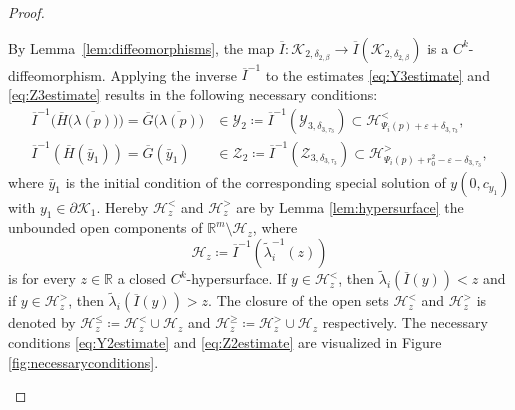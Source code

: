 \documentclass[10pt]{article}
\numberwithin{equation}{section}
\newcommand{\eps}{\varepsilon}
\begin{document}
\begin{proof}
\begin{enumerate}
			By Lemma~\ref{lem:diffeomorphisms}, the map $\overline{I}: \mathcal{K}_{2,\delta_{2,\beta}} \rightarrow \overline{I}(\mathcal{K}_{2,\delta_{2,\beta}})$ is a $C^k$-diffeomorphism. Applying the inverse $\overline{I}^{-1}$ to the estimates \eqref{eq:Y3estimate} and \eqref{eq:Z3estimate} results in the following necessary conditions:
			\begin{align}
				\overline{I}^{-1}\big(\overline{H}\big(\overline{\lambda(p)}\big)\big) = \overline{G}\big(\overline{\lambda(p)}\big)&\in \mathcal{Y}_2 \coloneqq \overline{I}^{-1}( \mathcal{Y}_{3,\delta_{3,\tau_3}}) \subset\mathcal{H}_{\Psi_i(p)+\eps+\delta_{3,\tau_3}}^{<}, \label{eq:Y2estimate}\\
				\overline{I}^{-1}(\overline{H}(\bar{y}_1)) = \overline{G}(\bar{y}_1) &\in \mathcal{Z}_2 \coloneqq \overline{I}^{-1}( \mathcal{Z}_{3,\delta_{3,\tau_3}}) \subset\mathcal{H}_{\Psi_i(p)+r_0^2-\eps-\delta_{3,\tau_3}}^{>},\label{eq:Z2estimate}
			\end{align}
			where $\bar{y}_1$ is the initial condition of the corresponding special solution of $y(0,c_{y_1})$ with $y_1\in\partial\mathcal{K}_1$. Hereby $\mathcal{H}_z^{<}$ and $\mathcal{H}_z^{>}$ are by Lemma \ref{lem:hypersurface} the unbounded open components of $\mathbb{R}^m\setminus \mathcal{H}_z$, where
			\begin{equation*}
				\mathcal{H}_z\coloneqq \overline{I}^{-1}(\tilde{\lambda}_i^{-1}(z))
			\end{equation*} 
			is for every $z\in\mathbb{R}$ a closed $C^k$-hypersurface. If $y\in \mathcal{H}_z^{<}$, then $\tilde{\lambda}_i(\overline{I}(y))<z$ and if $y\in \mathcal{H}_z^{>}$, then $\tilde{\lambda}_i(\overline{I}(y))>z$. The closure of the open sets $\mathcal{H}_z^{<}$ and $\mathcal{H}_z^{>}$ is denoted by $\mathcal{H}_z^{\leq} \coloneqq  \mathcal{H}_z^{<} \cup \mathcal{H}_z $ and $\mathcal{H}_z^{\geq}\coloneqq  \mathcal{H}_z^{>} \cup \mathcal{H}_z $ respectively. The necessary conditions \eqref{eq:Y2estimate} and \eqref{eq:Z2estimate} are visualized in Figure \ref{fig:necessaryconditions}.
			

\end{enumerate}
\end{proof}
\end{document}
